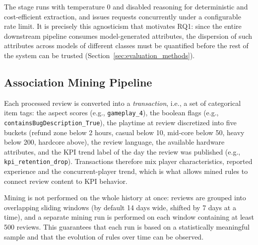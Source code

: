 The stage runs with temperature 0 and disabled reasoning for deterministic and cost-efficient extraction, and issues requests concurrently under a configurable rate limit. It is precisely this agnosticism that motivates RQ1: since the entire downstream pipeline consumes model-generated attributes, the dispersion of such attributes across models of different classes must be quantified before the rest of the system can be trusted (Section~\ref{sec:evaluation_methods}).

\subsection{Association Mining Pipeline}
\label{sec:mining_pipeline}

\begin{sloppypar}\noindent Each processed review is converted into a \emph{transaction}, i.e., a set of categorical item tags: the aspect scores (e.g., \texttt{gameplay\_4}), the boolean flags (e.g., \texttt{containsBugDescription\_\allowbreak True}), the playtime at review discretized into five buckets (refund zone below 2 hours, casual below 10, mid-core below 50, heavy below 200, hardcore above), the review language, the available hardware attributes, and the KPI trend label of the day the review was published (e.g., \texttt{kpi\_\allowbreak retention\_\allowbreak drop}). Transactions therefore mix player characteristics, reported experience and the concurrent-player trend, which is what allows mined rules to connect review content to KPI behavior.\end{sloppypar}

Mining is not performed on the whole history at once: reviews are grouped into overlapping sliding windows (by default 14 days wide, shifted by 7 days at a time), and a separate mining run is performed on each window containing at least 500 reviews. This guarantees that each run is based on a statistically meaningful sample and that the evolution of rules over time can be observed.

